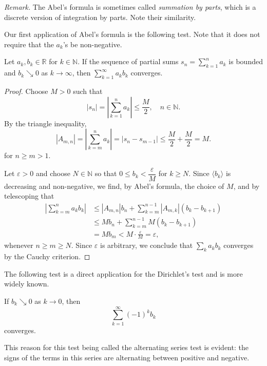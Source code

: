 \documentclass[11pt]{article}
\begin{document}
\noindent\textit{Remark.} The Abel's formula is sometimes called \textit{summation by parts}, which is a discrete version of integration by parts.  Note their similarity.

\medskip
Our first application of Abel's formula is the following test.
Note that it does not require that the $a_k$'s be non-negative.

\begin{thm}
  Let $a_k, b_k \in \mathbb{R}$ for $k \in \mathbb{N}$.
  If the sequence of partial sums $s_n = \sum_{k=1}^n a_k$ is bounded and $b_k \searrow 0$ as $k \to \infty$, then $\sum_{k=1}^\infty a_k b_k$ converges.
\end{thm}

\begin{proof}
  Choose $M > 0$ such that
  \[
    |s_n| = \left| \sum_{k=1}^n a_k \right| \leqslant \frac{M}{2}, \quad n \in \mathbb{N}.
  \]
  By the triangle inequality,
  \[
    |A_{m,n}| = \left| \sum_{k=m}^n a_k \right| = |s_n - s_{m-1}| \leqslant \frac{M}{2} + \frac{M}{2} = M.
  \]
  for $n \geqslant m > 1$.

  Let $\varepsilon > 0$ and choose $N \in \mathbb{N}$ so that $0 \leqslant b_k < \dfrac{\varepsilon}{M}$ for $k \geqslant N$.
  Since $\langle b_k \rangle$ is decreasing and non-negative, we find, by Abel's formula, the choice of $M$, and by telescoping that
  \begin{align*}
    \left| \sum_{k=m}^n a_k b_k \right| &\leqslant |A_{m,n}| b_n + \sum_{k=m}^{n-1} |A_{m,k}| (b_k - b_{k+1}) \\
    &\leqslant M b_n + \sum_{k=m}^{n-1} M (b_k - b_{k+1}) \\
    &= M b_m < M \cdot \frac{\varepsilon}{M} = \varepsilon,
  \end{align*}
  whenever $n \geqslant m \geqslant N$.
  Since $\varepsilon$ is arbitrary, we conclude that $\sum_k a_k b_k$ converges by the Cauchy criterion.
\end{proof}

The following test is a direct application for the Dirichlet's test and is more widely known.

\begin{cor}
  If $b_k \searrow 0$ as $k \to 0$, then
  \[
    \sum_{k=1}^\infty (-1)^k b_k
  \]
  converges.
\end{cor}

This reason for this test being called the alternating series test is evident: the signs of the terms in this series are alternating between positive and negative.
\end{document}

